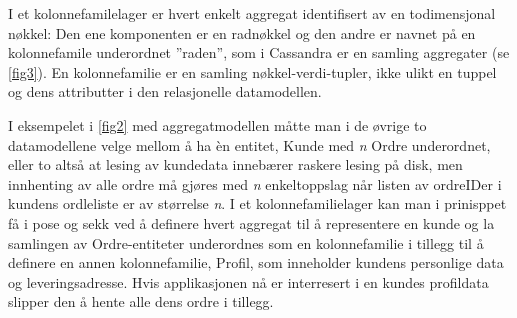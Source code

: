 I et kolonnefamilelager er hvert enkelt aggregat identifisert av en todimensjonal nøkkel: Den ene komponenten er en radnøkkel og den andre er navnet på en kolonnefamile underordnet ''raden'', som i Cassandra er en samling aggregater (se \ref{fig3}). En kolonnefamilie er en samling nøkkel-verdi-tupler, ikke ulikt en tuppel og dens attributter i den relasjonelle datamodellen.

I eksempelet i \ref{fig2} med aggregatmodellen måtte man i de øvrige to datamodellene velge mellom å ha èn entitet, Kunde med \emph{n} Ordre underordnet, eller to altså at lesing av kundedata innebærer raskere lesing på disk, men innhenting av alle ordre må gjøres med \emph{n} enkeltoppslag når listen av ordreIDer i kundens ordleliste er av størrelse \emph{n}. I et kolonnefamilielager kan man i prinisppet få i pose og sekk ved å definere hvert aggregat til å representere en kunde og la samlingen av Ordre-entiteter underordnes som en kolonnefamilie i tillegg til å definere en annen kolonnefamilie, Profil, som inneholder kundens personlige data og leveringsadresse. Hvis applikasjonen nå er interresert i en kundes profildata slipper den å hente alle dens ordre i tillegg.
